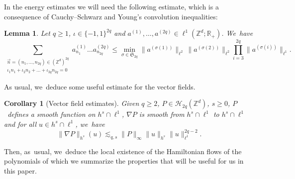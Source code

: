 \documentclass[10pt,a4paper]{amsart}
\theoremstyle{plain}
\newtheorem{corollary}[theorem]{Corollary}
\newtheorem{lemma}[theorem]{Lemma}
\theoremstyle{definition}
\newcommand{\Z}{\mathbb{Z}}
\newcommand{\R}{\mathbb{R}}
\newcommand{\1}{\mathbf{1}}
\begin{document}
In the energy estimates we will need the following estimate, which is a consequence of Cauchy--Schwarz and Young's convolution inequalities:
\begin{lemma}
\label{lem:young}
Let $q\geq1$, $\iota \in \{-1,1\}^{2q}$ and $a^{(1)},\dots, a^{(2q)}\in \ell^1(\Z^d ; \R_+)$. We~have
\[
\sum_{\substack{\vec{n}=(n_1,\dots,n_{2q})\in(\Z^d)^{2q}\\ \iota_1n_1+\iota_2n_2+\dots +\iota_{2q}n_{2q}=0}}a_{n_1}^{(1)}\dots a_{n_{2q}}^{(2q)}\leq\underset{{\sigma\in\mathfrak{S}_{2q}}}\min \| a^{(\sigma(1))} \|_{\ell^2}\,\| a^{(\sigma(2))} \|_{\ell^2} \prod_{i=3}^{2q}\| a^{(\sigma(i))} \|_{\ell^1}.
\]
\end{lemma}
As usual, we~deduce some useful estimate for the vector fields.
\begin{corollary}[Vector field estimates]\label{cor:vecfi} Given $q\geq 2$, $P\in \mathcal{H}_{2q}(\mathbb{Z}^d)$, $s\geq 0$, $P$~defines a smooth function on $h^s \cap \ell^1$, $\nabla P$ is smooth from $h^s \cap \ell^1$ to $h^s \cap \ell^1$ and for all $u\in h^s \cap \ell^1$, we~have
\[
\|\nabla P\|_{h^s}(u) \lesssim_{q,s} \| P \|_{\infty} \|u\|_{h^s} \|u\|_{\ell^1}^{2q-2}.
\]
\end{corollary}
Then, as~usual, we~deduce the local existence of the Hamiltonian flows of the polynomials of which we summarize the properties that will be useful for us in this paper.
\end{document}
